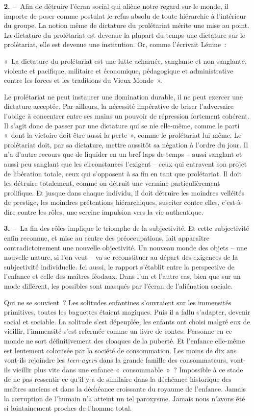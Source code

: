 \documentclass[french,twoside]{book} %
\newcommand{\labelchar}[1]{\textbf{\color{rubric} #1}}
\begin{document}
\labelchar{2. –} Afin de détruire l’écran social qui aliène notre regard sur le monde, il importe de poser comme postulat le refus absolu de toute hiérarchie à l’intérieur du groupe. La notion même de dictature du prolétariat mérite une mise au point. La dictature du prolétariat est devenue la plupart du temps une dictature sur le prolétariat, elle est devenue une institution. Or, comme l’écrivait Lénine :\par
« La dictature du prolétariat est une lutte acharnée, sanglante et non sanglante, violente et pacifique, militaire et économique, pédagogique et administrative contre les forces et les traditions du Vieux Monde ».\par
Le prolétariat ne peut instaurer une domination durable, il ne peut exercer une dictature acceptée. Par ailleurs, la nécessité impérative de briser l’adversaire l’oblige à concentrer entre ses mains un pouvoir de répression fortement cohérent. Il s’agit donc de passer par une dictature qui se nie elle-même, comme le parti « dont la victoire doit être aussi la perte », comme le prolétariat lui-même. Le prolétariat doit, par sa dictature, mettre aussitôt sa négation à l’ordre du jour. Il n’a d’autre recours que de liquider en un bref laps de temps – aussi sanglant et aussi peu sanglant que les circonstances l’exigent – ceux qui entravent son projet de libération totale, ceux qui s’opposent à sa fin en tant que prolétariat. Il doit les détruire totalement, comme on détruit une vermine particulièrement prolifique. Et jusque dans chaque individu, il doit détruire les moindres velléités de prestige, les moindres prétentions hiérarchiques, susciter contre elles, c’est-à-dire contre les rôles, une sereine impulsion vers la vie authentique.\par
\labelchar{3. –} La fin des rôles implique le triomphe de la subjectivité. Et cette subjectivité enfin reconnue, et mise au centre des préoccupations, fait apparaître contradictoirement une nouvelle objectivité. Un nouveau monde des objets – une nouvelle nature, si l’on veut – va se reconstituer au départ des exigences de la subjectivité individuelle. Ici aussi, le rapport s’établit entre la perspective de l’enfance et celle des maîtres féodaux. Dans l’un et l’autre cas, bien que sur un mode différent, les possibles sont masqués par l’écran de l’aliénation sociale.\par
Qui ne se souvient ? Les solitudes enfantines s’ouvraient sur les immensités primitives, toutes les baguettes étaient magiques. Puis il a fallu s’adapter, devenir social et sociable. La solitude s’est dépeuplée, les enfants ont choisi malgré eux de vieillir, l’immensité s’est refermée comme un livre de contes. Personne en ce monde ne sort définitivement des cloaques de la puberté. Et l’enfance elle-même est lentement colonisée par la société de consommation. Les moins de dix ans vont-ils rejoindre les \emph{teen-agers} dans la grande famille des consommateurs, vont-ils vieillir plus vite dans une enfance « consommable » ? Impossible à ce stade de ne pas ressentir ce qu’il y a de similaire dans la déchéance historique des maîtres anciens et dans la déchéance croissante du royaume de l’enfance. Jamais la corruption de l’humain n’a atteint un tel paroxysme. Jamais nous n’avons été si lointainement proches de l’homme total.\par
\end{document}

